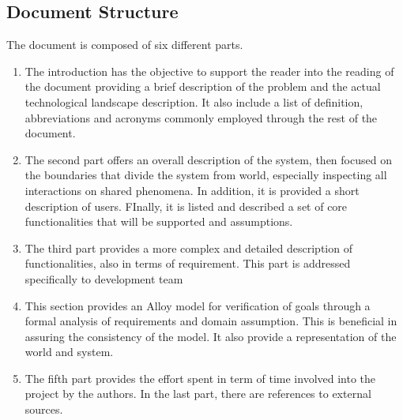 \subsection{Document Structure}

The document is composed of six different parts.

\begin{enumerate}
	
	\item The introduction has the objective to support the reader into the reading of the document providing a brief description of the problem and the actual technological landscape description. It also include a list of definition, abbreviations and acronyms commonly employed through the rest of the document.
	\item The second part offers an overall description of the system, then focused on the boundaries that divide the system from world, especially inspecting all interactions on shared phenomena. In addition, it is provided a short description of users. FInally, it is listed and described a set of core functionalities that will be supported and assumptions.
	\item The third part provides a more complex and detailed description of functionalities, also in terms of requirement. This part is addressed specifically to development team
	\item This section provides an Alloy model for verification of goals through a formal analysis of requirements and domain assumption. This is beneficial in assuring the consistency of the model. It also provide a representation of the world and system.
	\item The fifth part provides the effort spent in term of time involved into the project by the authors.
	In the last part, there are references to external sources.
	
\end{enumerate}

